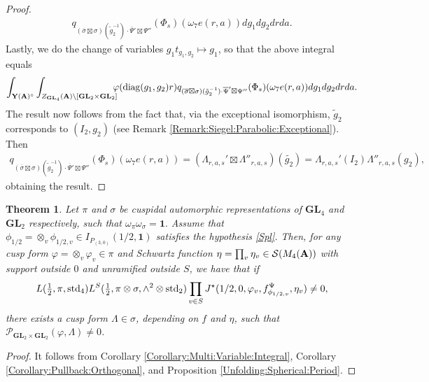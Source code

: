\documentclass[11pt, reqno]{amsart}
\theoremstyle{plain}
\newtheorem{theorem}{Theorem}[section]
\theoremstyle{definition}
\theoremstyle{remark}
\theoremstyle{plain}
\def\A{{\bf A}}
\def\GL{\mathbf{GL}}
\begin{document}
\begin{proof}
\begin{align*}
       q_{(\overline{\sigma} \boxtimes \sigma)(\tilde{g}_2^{-1}) \cdot \overline{\Psi}'\boxtimes\Psi''}(\Phi_{s})(\omega_7 e(r,a))dg_1dg_2drda .
        \end{align*}
      Lastly, we do the change of variables $g_1t_{g_1,g_2}\mapsto g_1$, so that the above integral equals 
        \begin{align*}
        \int_{ \mathbf{Y}(\A)^\circ } \int_{Z_{\GL_4}(\A)\backslash [\GL_2\times \GL_2]} \!\!\!\!\varphi({\rm diag}(g_1,g_2) r) 
       q_{(\overline{\sigma} \boxtimes \sigma)(\tilde{g}_2^{-1}) \cdot \overline{\Psi}'\boxtimes\Psi''}(\Phi_{s})(\omega_7 e(r,a))dg_1dg_2drda.  
             \end{align*}
      The result now follows from the fact that, via the exceptional isomorphism, $ \tilde{g}_2$ corresponds to $(I_2, g_2)$ (see Remark \ref{Remark:Siegel:Parabolic:Exceptional}). Then 
    \begin{align*}q_{(\overline{\sigma} \boxtimes \sigma)(\tilde{g}_2^{-1}) \cdot \overline{\Psi}'\boxtimes\Psi''}(\Phi_{s})(\omega_7e(r,a)) = \left( \Lambda_{r,a,s}'\boxtimes\Lambda''_{r,a,s}\right)(\tilde{g_2}) = \Lambda_{r,a,s}'(I_2)\Lambda''_{r,a,s}(g_2),
    \end{align*}
    obtaining the result. 
\end{proof}
\begin{theorem}\label{Main:Theorem:Spherical:Period}
     Let $\pi$ and $\sigma$ be cuspidal automorphic representations  of $\GL_4$ and $\GL_2$ respectively, such that $\omega_\pi  \omega_\sigma = \mathbf{1}.$
     Assume that $\phi_{1/2} = \otimes_v \phi_{1/2,v} \in  I_{P_{(3,0)}}(1/2, \mathbf{1})$ satisfies the hypothesis \eqref{Spl}. Then, for any cusp form $\varphi = \otimes_v \varphi_v\in \pi$ and Schwartz function $\eta = \prod_v \eta_v \in \mathcal{S}(M_4(\A))$ with support outside $0$ and unramified outside $S$, we have that if
     \begin{equation}\label{Lfunctionsandzetaintegrals} L( \tfrac{1}{2},\pi,{\rm std}_4)L^S(\tfrac{1}{2},\pi \otimes \sigma,\wedge^2 \otimes \mathrm{std}_2) \prod_{v \in S} J^\star(1/2,0,\varphi_v,f_{\phi_{1/2,v}}^\Psi,\eta_v)\neq 0,\end{equation}
     there exists a cusp form $\Lambda \in \sigma$, depending on $f$ and $\eta$, such that $\mathcal{P}_{\GL_2 \times \GL_2}(\varphi,\Lambda) \ne 0$. 
\end{theorem}
\begin{proof}
  It follows from Corollary \ref{Corollary:Multi:Variable:Integral}, Corollary \ref{Corollary:Pullback:Orthogonal}, and Proposition \ref{Unfolding:Spherical:Period}.
\end{proof}
\end{document}
